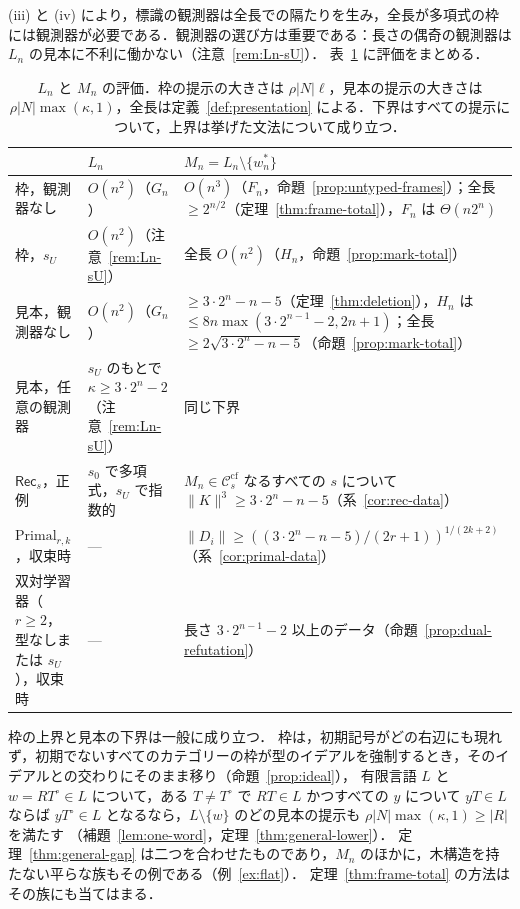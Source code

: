 \documentclass[11pt,a4paper]{ltjsarticle}
\numberwithin{equation}{section}
\theoremstyle{plain}
\theoremstyle{definition}
\theoremstyle{remark}
\theoremstyle{plain}
\newcommand{\Ccf}[1]{\mathcal C^{\mathrm{cf}}_{#1}}
\begin{document}
(iii) と (iv) により，標識の観測器は全長での隔たりを生み，全長が多項式の枠には観測器が必要である．観測器の選び方は重要である：長さの偶奇の観測器は $L_n$ の見本に不利に働かない（注意~\ref{rem:Ln-sU}）．
表~\ref{tab:summary} に評価をまとめる．

\begin{table}[t]
\centering\small\renewcommand{\arraystretch}{1.15}
\caption{$L_n$ と $M_n$ の評価．枠の提示の大きさは $\rho|N|\ell$，見本の提示の大きさは $\rho|N|\max(\kappa,1)$，全長は定義~\ref{def:presentation} による．下界はすべての提示について，上界は挙げた文法について成り立つ．}
\label{tab:summary}
\begin{tabular}{@{}>{\raggedright\arraybackslash}p{3.1cm}>{\raggedright\arraybackslash}p{3.6cm}>{\raggedright\arraybackslash}p{8.6cm}@{}}
\toprule
 & $L_n$ & $M_n=L_n\setminus\{w^*_n\}$\\
\midrule
枠，観測器なし & $O(n^2)$（$G_n$） & $O(n^3)$（$F_n$，命題~\ref{prop:untyped-frames}）；全長 $\ge2^{n/2}$（定理~\ref{thm:frame-total}），$F_n$ は $\Theta(n2^n)$\\
枠，$s_U$ & $O(n^2)$（注意~\ref{rem:Ln-sU}） & 全長 $O(n^2)$（$H_n$，命題~\ref{prop:mark-total}）\\
見本，観測器なし & $O(n^2)$（$G_n$） & $\ge3\cdot2^n-n-5$（定理~\ref{thm:deletion}），$H_n$ は $\le8n\max(3\cdot2^{n-1}-2,2n+1)$；全長 $\ge2\sqrt{3\cdot2^n-n-5}$（命題~\ref{prop:mark-total}）\\
見本，任意の観測器 & $s_U$ のもとで $\kappa\ge3\cdot2^n-2$（注意~\ref{rem:Ln-sU}） & 同じ下界\\
$\mathsf{Rec}_s$，正例 & $s_0$ で多項式，$s_U$ で指数的 \citep{kuriyama-tcs1} & $M_n\in\Ccf s$ なるすべての $s$ について $\|K\|^3\ge3\cdot2^n-n-5$（系~\ref{cor:rec-data}）\\
$\mathrm{Primal}_{r,k}$，収束時 & --- & $\|D_i\|\ge((3\cdot2^n-n-5)/(2r+1))^{1/(2k+2)}$（系~\ref{cor:primal-data}）\\
双対学習器（$r\ge2$，型なしまたは $s_U$），収束時 & --- & 長さ $3\cdot2^{n-1}-2$ 以上のデータ（命題~\ref{prop:dual-refutation}）\\
\bottomrule
\end{tabular}
\end{table}

枠の上界と見本の下界は一般に成り立つ．
枠は，初期記号がどの右辺にも現れず，初期でないすべてのカテゴリーの枠が型のイデアルを強制するとき，そのイデアルとの交わりにそのまま移り（命題~\ref{prop:ideal}），
有限言語 $L$ と $w=RT^\circ\in L$ について，ある $T\ne T^\circ$ で $RT\in L$ かつすべての $y$ について $yT\in L$ ならば $yT^\circ\in L$ となるなら，$L\setminus\{w\}$ のどの見本の提示も $\rho|N|\max(\kappa,1)\ge|R|$ を満たす
（補題~\ref{lem:one-word}，定理~\ref{thm:general-lower}）．
定理~\ref{thm:general-gap} は二つを合わせたものであり，$M_n$ のほかに，木構造を持たない平らな族もその例である（例~\ref{ex:flat}）．
定理~\ref{thm:frame-total} の方法はその族にも当てはまる．
\end{document}
